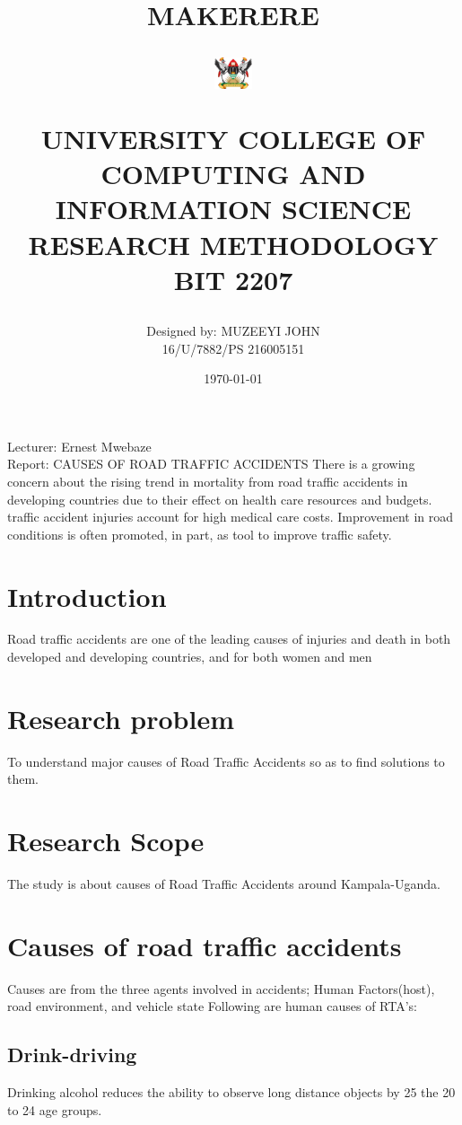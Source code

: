 \documentclass[12pt]{article}
\begin{document}
\title{\huge MAKERERE \begin{figure}[t!] \centering \includegraphics[width=0.1\textwidth]{image}  \end{figure} UNIVERSITY    COLLEGE OF COMPUTING AND INFORMATION SCIENCE  RESEARCH METHODOLOGY \\   BIT 2207}
\author{Designed by: MUZEEYI JOHN \\ 16/U/7882/PS 216005151}
\date{\today}
\maketitle
\large Lecturer: Ernest Mwebaze \\
\huge Report: CAUSES OF ROAD TRAFFIC ACCIDENTS
\newpage
\abstract 
There is a growing concern about the rising trend in mortality from road traffic accidents in developing countries due to their effect on health care resources and budgets. traffic accident injuries account for high medical care costs. Improvement in road conditions is often promoted, in part, as tool to improve traffic safety. 
\section{Introduction}
Road traffic accidents are one of the leading causes of injuries and death in both developed and developing countries, and for both women and men 
\section{Research problem}
To understand major causes of Road Traffic Accidents so as to find solutions to them.
\section{Research Scope}
The study is about causes of Road Traffic Accidents around Kampala-Uganda.
\section{Causes of road traffic accidents}
Causes are from the three agents involved in accidents; Human Factors(host), road environment, and vehicle state
Following are human causes of RTA's:
\subsection{Drink-driving}
  Drinking alcohol reduces the ability to observe long distance 
objects by 25%
the 20 to 24 age groups.
\end{document}
